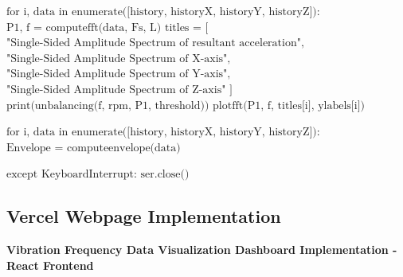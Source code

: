 \begin{algorithmic}[1]
	\STATE
	\STATE \hspace{0.5cm} $\text{for i, data in enumerate([history, historyX, historyY, historyZ]):}$
	\STATE \hspace{1.0cm} $\text{P1, f = computefft(data, Fs, L)}$
	\STATE \hspace{1.0cm} $\text{titles = [}$
	\STATE \hspace{1.5cm} $\text{"Single-Sided Amplitude Spectrum of resultant acceleration",}$
	\STATE \hspace{1.5cm} $\text{"Single-Sided Amplitude Spectrum of X-axis",}$
	\STATE \hspace{1.5cm} $\text{"Single-Sided Amplitude Spectrum of Y-axis",}$
	\STATE \hspace{1.5cm} $\text{"Single-Sided Amplitude Spectrum of Z-axis"}$
	\STATE \hspace{1.0cm} $\text{]}$
	\STATE \hspace{1.0cm} $\text{print(unbalancing(f, rpm, P1, threshold))}$
	\STATE \hspace{1.0cm} $\text{plotfft(P1, f, titles[i], ylabels[i])}$
	
	\STATE
	\STATE \hspace{0.5cm} $\text{for i, data in enumerate([history, historyX, historyY, historyZ]):}$
	\STATE \hspace{1.0cm} $\text{Envelope = computeenvelope(data)}$
	
	\STATE
	\STATE $\text{except KeyboardInterrupt:}$
	\STATE \hspace{0.5cm} $\text{ser.close()}$
\end{algorithmic}

\clearpage




\subsection{Vercel Webpage Implementation}
\label{subsec:vercel}

\noindent\textbf{Vibration Frequency Data Visualization Dashboard Implementation - React Frontend}

